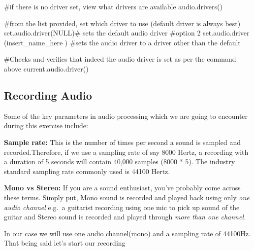 \documentclass[
  letterpaper,
  DIV=11,
  numbers=noendperiod]{scrreprt}
\newenvironment{Shaded}{\begin{snugshade}}{\end{snugshade}}
\newcommand{\CommentTok}[1]{\textcolor[rgb]{0.37,0.37,0.37}{#1}}
\newcommand{\ConstantTok}[1]{\textcolor[rgb]{0.56,0.35,0.01}{#1}}
\newcommand{\FunctionTok}[1]{\textcolor[rgb]{0.28,0.35,0.67}{#1}}
\newcommand{\NormalTok}[1]{\textcolor[rgb]{0.00,0.23,0.31}{#1}}
\begin{document}
\begin{Shaded}
\begin{Highlighting}[]
\CommentTok{\#if there is no driver set, view what drivers are available}
\FunctionTok{audio.drivers}\NormalTok{()}
\end{Highlighting}
\end{Shaded}

\begin{Shaded}
\begin{Highlighting}[]
\CommentTok{\#from the list provided, set which driver to use (default driver is always best)}
\FunctionTok{set.audio.driver}\NormalTok{(}\ConstantTok{NULL}\NormalTok{)}\CommentTok{\# sets the default audio driver}
\CommentTok{\#option 2}
\FunctionTok{set.audio.driver}\NormalTok{ (insert\_name\_here ) }\CommentTok{\#sets the audio driver to a driver other than the default}
\end{Highlighting}
\end{Shaded}

\begin{Shaded}
\begin{Highlighting}[]
\CommentTok{\#Checks and verifies that indeed the audio driver is set as per the command above}
\FunctionTok{current.audio.driver}\NormalTok{() }
\end{Highlighting}
\end{Shaded}

\hypertarget{recording-audio}{%
\subsection{Recording Audio}\label{recording-audio}}

Some of the key parameters in audio processing which we are going to
encounter during this exercise include:

\textbf{Sample rate:} This is the number of times per second a sound is
sampled and recorded.Therefore, if we use a sampling rate of say 8000
Hertz, a recording with a duration of 5 seconds will contain 40,000
samples (8000 * 5). The industry standard sampling rate commonly used is
44100 Hertz.

\textbf{Mono vs Stereo:} If you are a sound enthusiast, you've probably
come across these terms. Simply put, Mono sound is recorded and played
back using only \emph{one audio channel} e.g.~a guitarist recording
using one mic to pick up sound of the guitar and Stereo sound is
recorded and played through \emph{more than one channel.}

In our case we will use one audio channel(mono) and a sampling rate of
44100Hz. That being said let's start our recording
\end{document}
